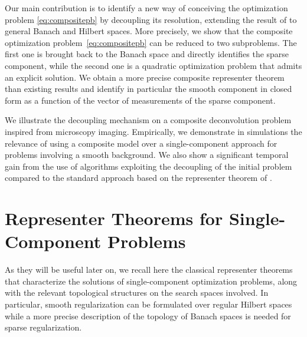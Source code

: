\documentclass[12pt]{article}
\begin{document}
    Our main contribution is to identify a new way of conceiving the optimization problem \eqref{eq:compositepb} by decoupling its resolution, extending the result of \cite{jarret2024decoupled} to general Banach and Hilbert spaces. More precisely, we show that the composite optimization problem~\eqref{eq:compositepb} can be reduced to two subproblems. The first one is brought back to the Banach space and directly identifies the sparse component, while the second one is a quadratic optimization problem that admits an explicit solution. We obtain a more precise composite representer theorem than existing results and identify in particular the smooth component in closed form as a function of the vector of measurements of the sparse component.


    We illustrate the decoupling mechanism on a composite deconvolution problem inspired from microscopy imaging.
    Empirically, we demonstrate in simulations the relevance of using a composite model over a single-component approach for problems involving a smooth background. We also show a significant temporal gain from the use of algorithms exploiting the decoupling of the initial problem compared to the standard approach based on the representer theorem of \cite{debarre2021continuous}. 




\section{Representer Theorems for Single-Component Problems}

    As they will be useful later on, we recall here the classical representer theorems that characterize the solutions of single-component optimization problems, along with the relevant topological structures on the search spaces involved. In particular, smooth regularization can be formulated over regular Hilbert spaces while a more precise description of the topology of Banach spaces is needed for sparse regularization. 
\end{document}
